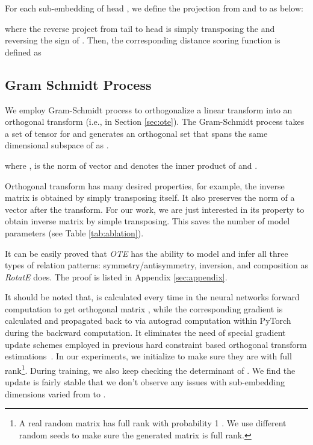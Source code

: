 \documentclass[11pt,a4paper]{article}
\begin{document}
For each sub-embedding  of head , we define the projection from  and  to  as below:

where the reverse project from tail to head is simply transposing the  and reversing the sign of . Then, the corresponding distance scoring function is defined as








\subsection{Gram Schmidt Process}
\label{sec:GS}

We employ Gram-Schmidt process to orthogonalize a linear transform into an orthogonal transform (i.e.,  in Section \ref{sec:ote}). The Gram-Schmidt process takes a set of tensor  for  and generates an orthogonal set
 that spans the same dimensional subspace of  as . 

where ,  is the  norm of vector  and  denotes the inner product of  and . 

Orthogonal transform has many desired properties,
for example, the inverse matrix is obtained by simply transposing itself. It also preserves the  norm of a vector after the transform. 
For our work, we are just interested in its property to obtain inverse matrix by simple transposing. This saves the number of model parameters (see Table \ref{tab:ablation}).


It can be easily proved that {\em OTE} has the ability to model and infer all three types of relation patterns: symmetry/antisymmetry, inversion, and composition as {\em RotatE} does. The proof is listed in Appendix \ref{sec:appendix}.

It should be noted that,  is calculated every time in the neural networks forward computation to get orthogonal matrix , while the corresponding gradient is calculated and propagated back to  via autograd computation within PyTorch during the backward computation. 
It eliminates the need of special gradient update schemes employed in previous hard constraint based orthogonal transform estimations~\cite{Harandi2016GeneralizedB,Vorontsov2017OnOA}.
In our experiments, we initialize  to make sure they are with full rank\footnote{A real random matrix has full rank with probability 1 \cite{slinko2000generalization}. We use different random seeds to make sure the generated matrix is full rank.}. During training, we also keep checking the determinant of . We find the update is fairly stable that we don't observe any issues with sub-embedding dimensions varied from  to .
\end{document}
